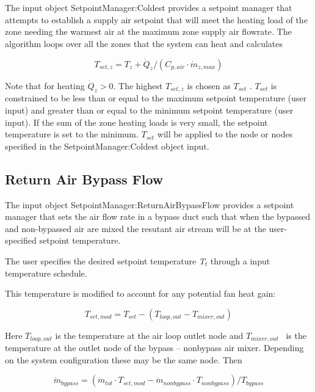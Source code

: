 The input object SetpointManager:Coldest provides a setpoint manager that attempts to establish a supply air setpoint that will meet the heating load of the zone needing the warmest air at the maximum zone supply air flowrate. The algorithm loops over all the zones that the system can heat and calculates

\begin{equation}
{T_{set,z}} = {T_z} + {\dot Q_z}/({C_{p,air}}\cdot {\dot m_{z,max}})
\end{equation}

Note that for heating \({\dot Q_z} > 0.\) The highest \({T_{set,z}}\) is chosen as \({T_{set}}\) . \({T_{set}}\) is constrained to be less than or equal to the maximum setpoint temperature (user input) and greater than or equal to the minimum setpoint temperature (user input). If the sum of the zone heating loads is very small, the setpoint temperature is set to the minimum. \({T_{set}}\) will be applied to the node or nodes specified in the SetpointManager:Coldest object input.

\subsection{Return Air Bypass Flow}\label{return-air-bypass-flow}

The input object SetpointManager:ReturnAirBypassFlow provides a setpoint manager that sets the air flow rate in a bypass duct such that when the bypassed and non-bypassed air are mixed the resutant air stream will be at the user-specified setpoint temperature.

The user specifies the desired setpoint temperature \emph{T\(_{t}\)} through a input temperature schedule.

This temperature is modified to account for any potential fan heat gain:

\begin{equation}
{T_{set,mod}} = {T_{set}} - ({T_{loop,out}} - {T_{mixer,out}})
\end{equation}

Here \({T_{loop,out}}\) is the temperature at the air loop outlet node and \({T_{mixer,out}}\) ~is the temperature at the outlet node of the bypass -- nonbypass air mixer. Depending on the system configuration these may be the same node. Then

\begin{equation}
{\dot m_{bypass}} = ({\dot m_{tot}}\cdot {T_{set,mod}} - {\dot m_{nonbypass}}\cdot {T_{nonbypass}})/{T_{bypass}}
\end{equation}

